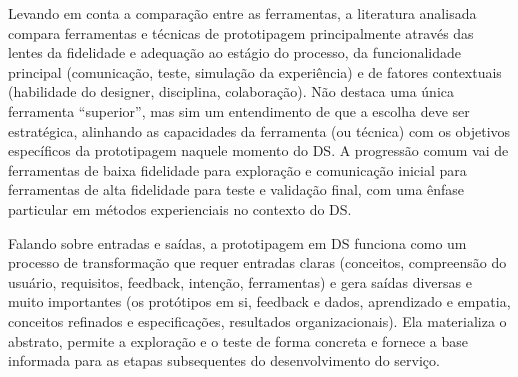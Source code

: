 Levando em conta a comparação entre as ferramentas, a literatura analisada compara ferramentas e técnicas de prototipagem principalmente através das lentes da fidelidade e adequação ao estágio do processo, da funcionalidade principal (comunicação, teste, simulação da experiência) e de fatores contextuais (habilidade do designer, disciplina, colaboração). Não destaca uma única ferramenta ``superior'', mas sim um entendimento de que a escolha deve ser estratégica, alinhando as capacidades da ferramenta (ou técnica) com os objetivos específicos da prototipagem naquele momento do DS. A progressão comum vai de ferramentas de baixa fidelidade para exploração e comunicação inicial para ferramentas de alta fidelidade para teste e validação final, com uma ênfase particular em métodos experienciais no contexto do DS.

Falando sobre entradas e saídas, a prototipagem em DS funciona como um processo de transformação que requer entradas claras (conceitos, compreensão do usuário, requisitos, feedback, intenção, ferramentas) e gera saídas diversas e muito importantes (os protótipos em si, feedback e dados, aprendizado e empatia, conceitos refinados e especificações, resultados organizacionais). Ela materializa o abstrato, permite a exploração e o teste de forma concreta e fornece a base informada para as etapas subsequentes do desenvolvimento do serviço.

